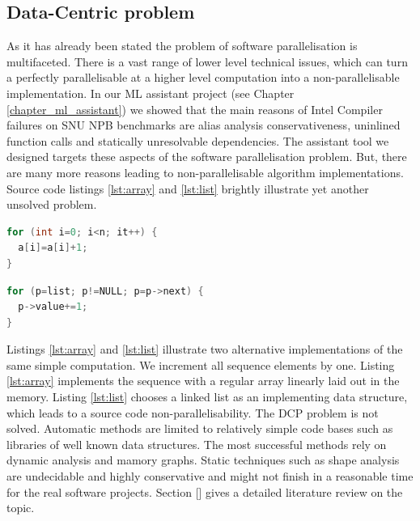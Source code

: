 \subsection{Data-Centric problem}
\quad As it has already been stated the problem of software parallelisation is multifaceted. There is a vast range of lower level technical issues, which can turn a perfectly parallelisable at a higher level computation into a non-parallelisable implementation. In our ML assistant project (see Chapter \ref{chapter_ml_assistant}) we showed that the main reasons of Intel Compiler failures on SNU NPB benchmarks are alias analysis conservativeness, uninlined function calls and statically unresolvable dependencies. The assistant tool we designed targets these aspects of the software parallelisation problem. But, there are many more reasons leading to non-parallelisable algorithm implementations. Source code listings \ref{lst:array} and \ref{lst:list} brightly illustrate yet another unsolved problem.\newline\null
\begin{minipage}[t]{0.45\linewidth}
\begin{lstlisting}[caption={Parallelisable loop operating on a \textbf{linear array}.},label={lst:array},language=C]
for (int i=0; i<n; it++) {
  a[i]=a[i]+1;
}
\end{lstlisting}
\end{minipage}
%
\begin{minipage}[t]{0.55\linewidth}
\begin{lstlisting}[caption={Non-parallelisable loop operating on a \textbf{linked-list}.},label={lst:list},language=C]
for (p=list; p!=NULL; p=p->next) {
  p->value+=1;
}
\end{lstlisting}
\end{minipage}
\quad Listings \ref{lst:array} and \ref{lst:list} illustrate two alternative implementations of the same simple computation. We increment all sequence elements by one. Listing \ref{lst:array} implements the sequence with a regular array linearly laid out in the memory. Listing \ref{lst:list} chooses a linked list as an implementing data structure, which leads to a source code non-parallelisability.\newline\null
\quad The DCP problem is not solved. Automatic methods are limited to relatively simple code bases such as libraries of well known data structures. The most successful methods rely on dynamic analysis and mamory graphs. Static techniques such as shape analysis are undecidable and highly conservative and might not finish in a reasonable time for the real software projects. Section [] gives a detailed literature review on the topic. 


